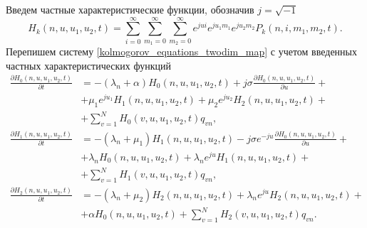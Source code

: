 Введем частные характеристические функции, обозначив $j=\sqrt{-1}$
\begin{equation*}
	H_{k}(n,u,u_{1},u_{2},t) = \sum_{i=0}^{\infty}
	\sum_{m_{1}=0}^{\infty}
	\sum_{m_{2}=0}^{\infty}  
	e^{jui}e^{ju_{1}m_{1}}e^{ju_{2}m_{2}} P_{k}(n,i,m_{1},m_{2},t).
\end{equation*}
Перепишем систему \eqref{kolmogorov_equations_twodim_map} с учетом введенных частных характеристических функций
\begin{equation} \label{characteristic_equations_twodim_map}
	\begin{split}
		\frac{{\partial H_{0}(n,u,u_{1},u_{2},t)}}{{\partial t}} &= -(\lambda_{n} + \alpha)H_{0}(n,u,u_{1},u_{2},t) + j\sigma
		\frac{{\partial H_{0}(n,u,u_{1},u_{2},t)}}{{\partial u}} +\\  &+ \mu_{1} e^{ju_{1}}H_{1}(n,u,u_{1},u_{2},t) + \mu_{2}e^{ju_{2}}H_{2}(n,u,u_{1},u_{2},t) +\\  &+ \sum_{v=1}^{N}H_{0}(v,u,u_{1},u_{2},t)q_{vn} ,
		\\
		\frac{{\partial H_{1}(n,u,u_{1},u_{2},t)}}{{\partial t}} &= -(\lambda_{n} + \mu_{1})H_{1}(n,u,u_{1},u_{2},t) - j\sigma e^{-ju}
		\frac{{\partial H_{0}(n,u,u_{1},u_{2},t)}}{{\partial u}} +\\  &+ \lambda_{n} H_{0}(n,u,u_{1},u_{2},t) + \lambda_{n} e^{ju}H_{1}(n,u,u_{1},u_{2},t) +\\  &+ \sum_{v=1}^{N}H_{1}(v,u,u_{1},u_{2},t)q_{vn} ,
		\\
		\frac{{\partial H_{2}(n,u,u_{1},u_{2},t)}}{{\partial t}} &= -(\lambda_{n} + \mu_{2})H_{2}(n,u,u_{1},u_{2},t)  + \lambda_{n} e^{ju}H_{2}(n,u,u_{1},u_{2},t) +\\  &+ \alpha H_{0}(n,u,u_{1},u_{2},t) + \sum_{v=1}^{N}H_{2}(v,u,u_{1},u_{2},t)q_{vn}.
	\end{split}
\end{equation}  

